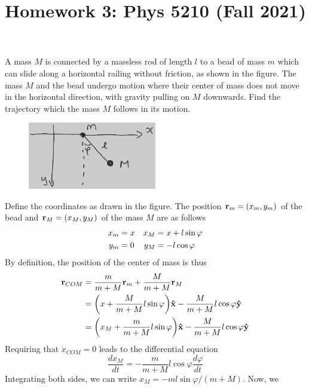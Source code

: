\documentclass[12pt]{article}
\title{Homework 3: Phys 5210 (Fall 2021)}
\begin{document}
   
\maketitle

\begin{problem}{1}
    A mass $M$ is connected by a massless rod of length $l$ to a bead of mass
    $m$ which can slide along a horizontal railing without friction, as shown in
    the figure. The mass $M$ and the bead undergo motion where their center of
    mass does not move in the horizontal direction, with gravity pulling on $M$
    downwards. Find the trajectory which the mass $M$ follows in its motion.
    \begin{figure}[h]
        \centering
        \includegraphics[width=0.5\textwidth]{hw3_p1.jpg}
    \end{figure}
\begin{solution}
    Define the coordinates as drawn in the figure. The position
    $\vb{r}_m=(x_m,y_m)$ of the bead and $\vb{r}_M=(x_M,y_M)$ of the mass $M$ 
    are as follows
    \begin{align}
        x_m&=x & x_M&=x+l\sin\varphi\notag\\
        y_m&=0 & y_M&=-l\cos\varphi
    \end{align}
    By definition, the position of the center of mass is thus
    \begin{align}
        \vb{r}_{COM}
        &=\frac{m}{m+M}\vb{r}_m+\frac{M}{m+M}\vb{r}_M\notag\\
        &=\qty(x+\frac{M}{m+M}l\sin\varphi)\vb{\hat{x}}
        -\frac{M}{m+M}l\cos\varphi\vb{\hat{y}}\notag\\
        &=\qty(x_M+\frac{m}{m+M}l\sin\varphi)\vb{\hat{x}}
        -\frac{M}{m+M}l\cos\varphi\vb{\hat{y}}
    \end{align}
    Requiring that $\dot{x}_{COM}=0$ leads to the differential equation
    \begin{equation}
        \frac{dx_M}{dt}=-\frac{m}{m+M}l\cos\varphi\frac{d\varphi}{dt} 
    \end{equation}
    Integrating both sides, we can write $x_M=-ml\sin\varphi/(m+M)$. Now, we

\end{solution}
\end{problem}
\end{document}
